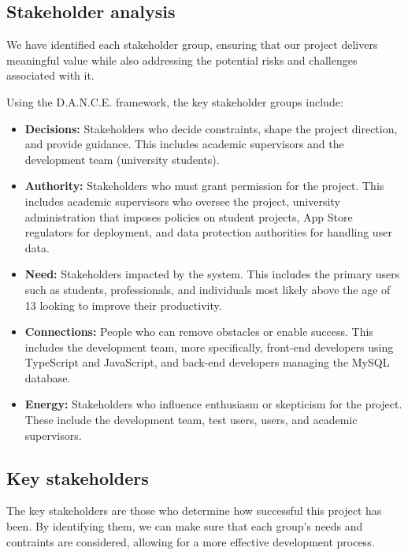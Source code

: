 \subsection{Stakeholder analysis}
We have identified each stakeholder group, ensuring that our project delivers meaningful value while also addressing the potential risks and challenges associated with it.

Using the D.A.N.C.E. framework, the key stakeholder groups include:
\begin{itemize}
    \item \textbf{Decisions:} Stakeholders who decide constraints, shape the project direction, and provide guidance. This includes academic supervisors and the development team (university students).

    \item \textbf{Authority:} Stakeholders who must grant permission for the project. This includes academic supervisors who oversee the project, university administration that imposes policies on student projects, App Store regulators for deployment, and data protection authorities for handling user data.

    \item \textbf{Need:} Stakeholders impacted by the system. This includes the primary users such as students, professionals, and individuals most likely above the age of 13 looking to improve their productivity.

    \item \textbf{Connections:} People who can remove obstacles or enable success. This includes the development team, more specifically, front-end developers using TypeScript and JavaScript, and back-end developers managing the MySQL database.

    \item \textbf{Energy:} Stakeholders who influence enthusiasm or skepticism for the project. These include the development team, test users, users, and academic supervisors.
\end{itemize}

\subsection{Key stakeholders}
The key stakeholders are those who determine how successful this project has been. By identifying them, we can make sure that each group's needs and contraints are considered, allowing for a more effective development process.

